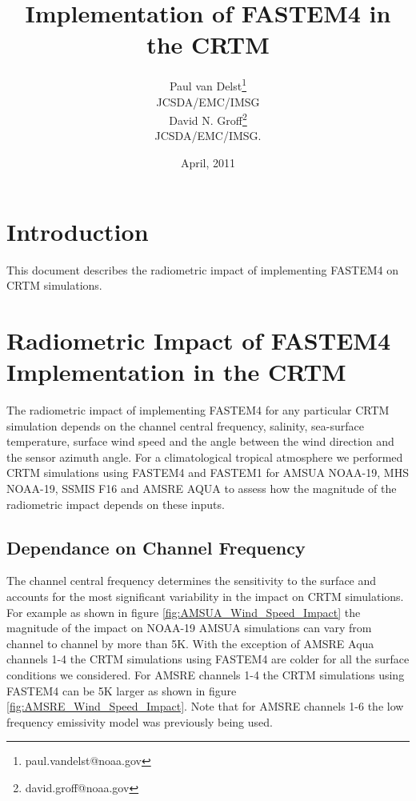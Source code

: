 

%

\title{Implementation of FASTEM4 in the CRTM}
\author{Paul van Delst\footnote{paul.vandelst@noaa.gov}\\JCSDA/EMC/IMSG\\[0.25in]
        David N. Groff\footnote{david.groff@noaa.gov}\\JCSDA/EMC/IMSG.}
\date{April, 2011}


\maketitle

\draftwatermark

\section{Introduction}
This document describes the radiometric impact of implementing FASTEM4 on CRTM simulations.

\section{Radiometric Impact of FASTEM4 Implementation in the CRTM}
The radiometric impact of implementing FASTEM4 for any particular CRTM simulation depends on the channel central frequency, salinity, sea-surface temperature, surface wind speed and the angle between the wind direction and the sensor azimuth angle.  For a climatological tropical atmosphere we performed CRTM simulations using FASTEM4 and FASTEM1 for AMSUA NOAA-19, MHS NOAA-19, SSMIS F16 and AMSRE AQUA to assess how the magnitude of the radiometric impact depends on these inputs.  

\subsection{Dependance on Channel Frequency}
The channel central frequency determines the sensitivity to the surface and accounts for the most significant variability in the impact on CRTM simulations.  For example as shown in figure \ref{fig:AMSUA_Wind_Speed_Impact} the magnitude of the impact on NOAA-19 AMSUA simulations can vary from channel to channel by more than 5K.  With the exception of AMSRE Aqua channels 1-4 the CRTM simulations using FASTEM4 are colder for all the surface conditions we considered.  For AMSRE channels 1-4 the CRTM simulations using FASTEM4 can be 5K larger as shown in figure \ref{fig:AMSRE_Wind_Speed_Impact}.  Note that for AMSRE channels 1-6 the low frequency emissivity model was previously being used.

